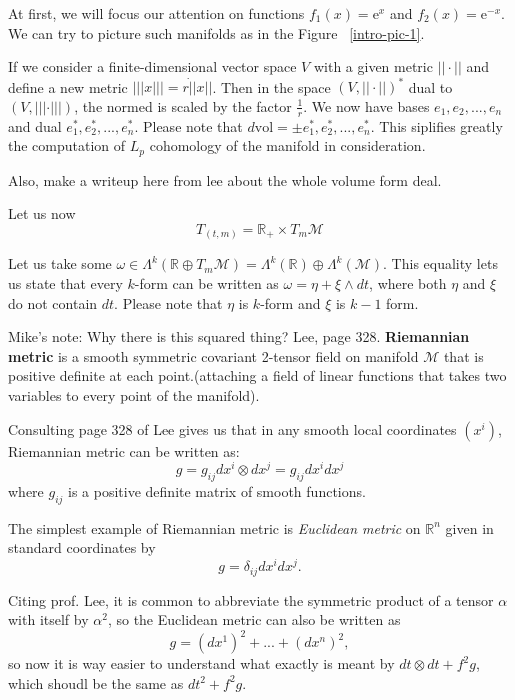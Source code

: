 \documentclass[licencjacka]{pracamgr}
\begin{document}

At first, we will focus our attention on functions $f_1(x) = \mathrm{e}^{x}$ and
$f_2(x) = \mathrm{e}^{-x}$. We can try to picture such manifolds as in the 
Figure ~\ref{intro-pic-1}.

If we consider a finite-dimensional vector space $V$ with a given metric $||
\cdot ||$ and define a new metric $||| x |||  = r \dot || x ||$. Then in the
space $(V, || \cdot||)^\ast$ dual to $(V, ||| \cdot |||)$, the normed is scaled
by the factor $\frac{1}{r}$. We now have bases $e_1, e_2, ..., e_n$ and dual
$e_1^\ast, e_2^\ast, ..., e_n^\ast$. Please note that $d\mathrm{vol} = \pm
e_1^\ast, e_2^\ast, ..., e_n^\ast $. This siplifies greatly the computation of
$L_p$ cohomology of the manifold in consideration.

Also, make a writeup here from lee about the whole volume form deal.


Let us now
\[
    T_{(t, m)} = \mathbb{R}_+ \times T_m \mathcal{M}
\]

Let us take some $ \omega \in \Lambda^k(\mathbb{R} \oplus T_m \mathcal{M}) = 
\Lambda^k(\mathbb{R})  \oplus \Lambda^k(\mathcal{M}) $.
This equality lets us state that every $k$-form can be written as $\omega = \eta
+ \xi \wedge dt$, where both $\eta$ and $\xi$ do not contain $dt$.  Please note
that $\eta$ is $k$-form and $\xi$ is $k-1$ form. \\

\scriptsize

    Mike's note: Why there is this squared thing?
    Lee, page 328.
    \textbf{Riemannian metric} is a smooth symmetric covariant 2-tensor field
    on manifold $\mathcal{M}$ that is positive definite at each point.(attaching
    a field of linear functions that takes two variables to every point of the
    manifold).

    Consulting page 328 of Lee gives us that in any smooth local coordinates
    $(x^i)$, Riemannian metric can be written as:
    \[
        g = g_{ij} dx^i \otimes dx^j = g_{ij} dx^i dx^j
    \]
    where $g_{ij}$ is a positive definite matrix of smooth functions. 

    The simplest example of Riemannian metric is \emph{Euclidean metric} on
    $\mathbb{R}^n$ given in standard coordinates by 
    \[
        g = \delta_{ij}dx^idx^j.
    \]

    Citing prof. Lee, it is common to abbreviate the symmetric product of a tensor
    $\alpha$ with itself by $\alpha^2$, so the Euclidean metric can also be written
    as 
    \[
        g = (dx^1)^2 + ...  + (dx^n)^2,
    \]
    so now it is way easier to understand what exactly is meant by
    $ dt \otimes dt + f^2g $, which shoudl be the same as $dt^2 + f^2g$. \\
\end{document}
